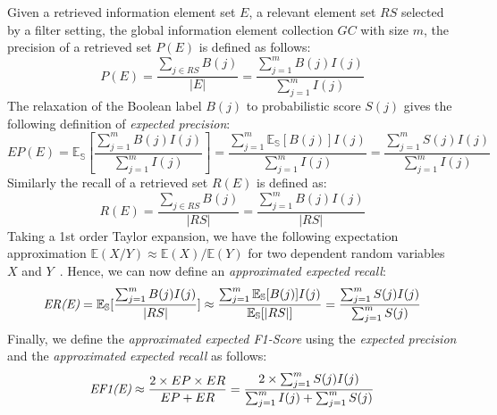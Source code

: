 Given a retrieved information element set $E$, a relevant element set $RS$ selected by a filter setting, the global information element collection $GC$ with size $m$, the precision of a retrieved set $P(E)$ is defined as follows:
\begin{equation}
   P(E) = \dfrac{\sum_{j \in RS} B(j)}{|E|} = \dfrac{\sum_{j=1}^m B(j)I(j)}{\sum_{j=1}^m I(j)} 
\end{equation}
The relaxation of the Boolean label $B(j)$ to probabilistic score $S(j)$ gives the following definition of \emph{expected precision}: 
\begin{equation}
EP(E)=\mathbb{E_{S}}[\dfrac{\sum_{j=1}^{m}B(j)I(j)}{\sum_{j=1}^{m}I(j)}]=\dfrac{\sum_{j=1}^{m}\mathbb{E_{S}}[B(j)]I(j)}{\sum_{j=1}^{m}I(j)}=\dfrac{\sum_{j=1}^{m}S(j)I(j)}{\sum_{j=1}^{m}I(j)}
\end{equation}
Similarly the recall of a retrieved set $R(E)$ is defined as:
\begin{equation}
   R(E) = \dfrac{\sum_{j \in RS} B(j)}{|RS|} = \dfrac{\sum_{j=1}^m B(j)I(j)}{|RS|} 
\end{equation}
Taking a 1st order Taylor expansion, we have the following expectation approximation %
$\mathbb{E}(X/Y)\approx \mathbb{E}(X)/ \mathbb{E}(Y)$ for two dependent random variables $X$ and $Y$~\cite{Kempen2000}. Hence, 
we can now define an \emph{approximated expected recall}: 
\begin{equation}
   	\emph{ER(E)}=\mathbb{E_{S}}[\dfrac{\sum_{j=1}^{m}B(j)I(j)}{|RS|}] \approx \dfrac{\sum_{j=1}^{m}\mathbb{E_{S}}[B(j)]I(j)}{\mathbb{E_{S}}[|RS|]} = \dfrac{\sum_{j=1}^m S(j)I(j)}{\sum_{j=1}^m S(j)} 
\end{equation}
Finally, we define the \emph{approximated expected F1-Score} using the \emph{expected precision} and the \emph{approximated expected recall} as follows: 
\begin{align}
    \emph{EF1(E)}  \approx \dfrac{2\times EP\times ER}{EP+ER} = \dfrac{2\times\sum_{j=1}^m S(j)I(j)}{\sum_{j=1}^m I(j) + \sum_{j=1}^m S(j)}
\end{align}
  
  


